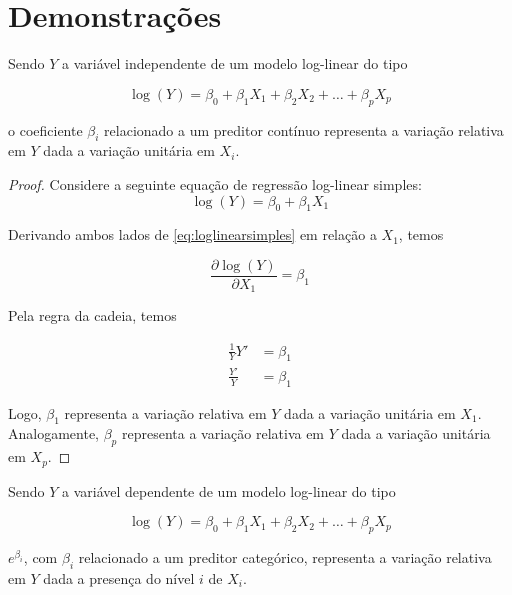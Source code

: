 

\chapter{Demonstrações} \label{apendice_demonstracoes}

\begin{proposition}
  \label{proposicao1}

  Sendo $Y$ a variável independente de um modelo log-linear do tipo
  
  \begin{equation}
    \log(Y) = \beta_0 + \beta_1X_1 + \beta_2X_2 + \ldots + \beta_pX_p
  \end{equation} \label{eq:loglinear}
  
  \noindent o coeficiente $\beta_i$ relacionado a um preditor contínuo representa a variação relativa em $Y$ dada a variação unitária em $X_i$.

\end{proposition}

\begin{proof}
  Considere a seguinte equação de regressão log-linear simples:
  \begin{equation} \label{eq:loglinearsimples}
    \log(Y) = \beta_0 + \beta_1X_1
  \end{equation}

  Derivando ambos lados de \eqref{eq:loglinearsimples} em relação a $X_1$, temos

  \begin{equation} \label{eq:derivada1}
    \frac{\partial \log(Y)}{\partial X_1} = \beta_1
  \end{equation}

  Pela regra da cadeia, temos

  $$
  \begin{aligned}
    \frac{1}{Y}Y' &= \beta_1\\
    \frac{Y'}{Y} &= \beta_1
  \end{aligned}
  $$

  Logo, $\beta_1$ representa a variação relativa em $Y$ dada a variação unitária em $X_1$. Analogamente, $\beta_p$ representa a variação relativa em $Y$ dada a variação unitária em $X_p$.

\end{proof}

\begin{proposition}
  \label{proposicao2}

  Sendo $Y$ a variável dependente de um modelo log-linear do tipo
  
  \begin{equation}
    \log(Y) = \beta_0 + \beta_1X_1 + \beta_2X_2 + \ldots + \beta_pX_p
  \end{equation} \label{eq:loglinear2}
  
  \noindent $e^{\beta_i}$, com $\beta_i$ relacionado a um preditor categórico, representa a variação relativa em $Y$ dada a presença do nível $i$ de $X_i$.
\end{proposition}

